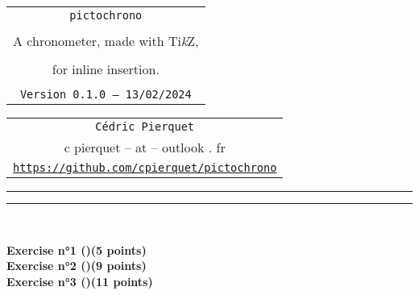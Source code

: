 \documentclass[english,11pt,a4paper]{article}
\def\TPversion{0.1.0}
\def\TPdate{13/02/2024}
\begin{document}
\pagestyle{fancy}

\thispagestyle{empty}

\begin{center}
	\begin{minipage}{0.88\linewidth}
	\begin{tcolorbox}[colframe=yellow,colback=yellow!15]
		\begin{center}
			\begin{tabular}{c}
				{\Huge \texttt{pictochrono}}\\
				\\
				{\LARGE A chronometer, made with Ti\textit{k}Z,} \\
				\\
				{\LARGE for inline insertion.} \\
				\\
				{\small \texttt{Version \TPversion{} -- \TPdate}}
		\end{tabular}
		\end{center}
	\end{tcolorbox}
\end{minipage}
\end{center}

\begin{center}
	\begin{tabular}{c}
	\texttt{Cédric Pierquet}\\
	{\ttfamily c pierquet -- at -- outlook . fr}\\
	\texttt{\url{https://github.com/cpierquet/pictochrono}}
\end{tabular}
\end{center}

\hrule


\hypertarget{matoc}{}

\tableofcontents

\vspace*{5mm}

\hrule

\vspace*{5mm}

\vfill

\begin{tcolorbox}[colframe=lightgray,colback=lightgray!10]
\hfill
{}
\hfill~
\end{tcolorbox}

\medskip

\begin{tcolorbox}[colframe=lightgray,colback=lightgray!10]
{\LARGE\bfseries\sffamily Exercise n°1 ()\dotfill(5 points)}\\
{\LARGE\bfseries\sffamily Exercise n°2 ()\dotfill(9 points)}\\
{\LARGE\bfseries\sffamily Exercise n°3 ()\dotfill(11 points)}
\end{tcolorbox}
\end{document}

